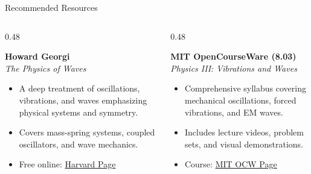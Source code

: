 \documentclass[aspectratio=169,xcolor=dvipsnames]{beamer}
\begin{document}
\begin{frame}{Recommended Resources}
  \begin{columns}[T]
    \begin{column}{0.48\textwidth}
      \begin{umnote}[Textbook]
        \textbf{Howard Georgi} \\
        \emph{The Physics of Waves}
        \begin{itemize}
          \item A deep treatment of oscillations, vibrations, and waves emphasizing physical systems and symmetry.
          \item Covers mass-spring systems, coupled oscillators, and wave mechanics.
          \item Free online: \href{https://www.physics.harvard.edu/~georgi/onenew.pdf}{Harvard Page}
        \end{itemize}
      \end{umnote}
    \end{column}
    \hfill
    \begin{column}{0.48\textwidth}
      \begin{umnote}
        \textbf{MIT OpenCourseWare (8.03)} \\
        \emph{Physics III: Vibrations and Waves}
        \begin{itemize}
          \item Comprehensive syllabus covering mechanical oscillations, forced vibrations, and EM waves.
          \item Includes lecture videos, problem sets, and visual demonstrations.
          \item Course: \href{https://ocw.mit.edu/courses/8-03sc-physics-iii-vibrations-and-waves-fall-2016/}{MIT OCW Page}
        \end{itemize}
      \end{umnote}
    \end{column}
  \end{columns}
\end{frame}

\begin{frame}[plain]
\end{frame}
\end{document}
